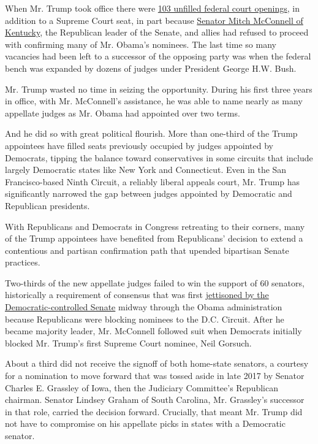 When Mr. Trump took office there were
\href{https://www.brookings.edu/blog/fixgov/2020/01/28/judicial-appointments-in-trumps-first-three-years-myths-and-realities/}{103
unfilled federal court openings}, in addition to a Supreme Court seat,
in part because
\href{https://www.brookings.edu/blog/fixgov/2018/06/04/senate-obstructionism-handed-judicial-vacancies-to-trump/}{Senator
Mitch McConnell of Kentucky}, the Republican leader of the Senate, and
allies had refused to proceed with confirming many of Mr. Obama's
nominees. The last time so many vacancies had been left to a successor
of the opposing party was when the federal bench was expanded by dozens
of judges under President George H.W. Bush.

Mr. Trump wasted no time in seizing the opportunity. During his first
three years in office, with Mr. McConnell's assistance, he was able to
name nearly as many appellate judges as Mr. Obama had appointed over two
terms.

And he did so with great political flourish. More than one-third of the
Trump appointees have filled seats previously occupied by judges
appointed by Democrats, tipping the balance toward conservatives in some
circuits that include largely Democratic states like New York and
Connecticut. Even in the San Francisco-based Ninth Circuit, a reliably
liberal appeals court, Mr. Trump has significantly narrowed the gap
between judges appointed by Democratic and Republican presidents.

With Republicans and Democrats in Congress retreating to their corners,
many of the Trump appointees have benefited from Republicans' decision
to extend a contentious and partisan confirmation path that upended
bipartisan Senate practices.

Two-thirds of the new appellate judges failed to win the support of 60
senators, historically a requirement of consensus that was first
\href{https://www.nytimes3xbfgragh.onion/2013/11/22/us/politics/reid-sets-in-motion-steps-to-limit-use-of-filibuster.html}{jettisoned
by the Democratic-controlled Senate} midway through the Obama
administration because Republicans were blocking nominees to the D.C.
Circuit. After he became majority leader, Mr. McConnell followed suit
when Democrats initially blocked Mr. Trump's first Supreme Court
nominee, Neil Gorsuch.

About a third did not receive the signoff of both home-state senators, a
courtesy for a nomination to move forward that was tossed aside in late
2017 by Senator Charles E. Grassley of Iowa, then the Judiciary
Committee's Republican chairman. Senator Lindsey Graham of South
Carolina, Mr. Grassley's successor in that role, carried the decision
forward. Crucially, that meant Mr. Trump did not have to compromise on
his appellate picks in states with a Democratic senator.

